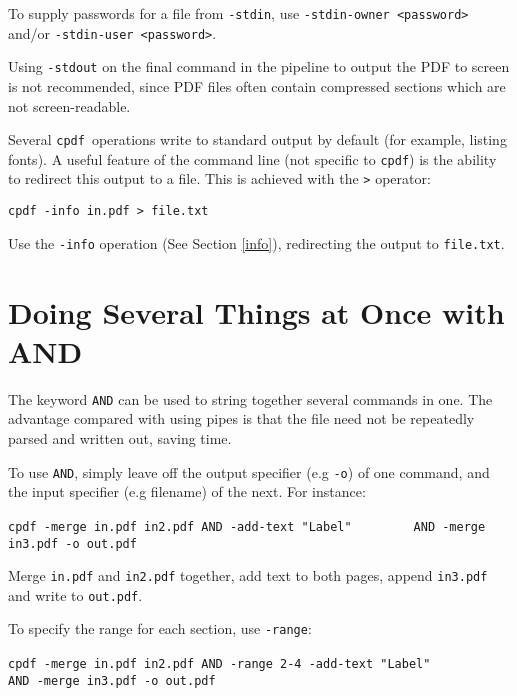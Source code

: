 \documentclass{book}
\newcommand{\cpdf}{\texttt{cpdf}}
\begin{document}
To supply passwords for a file from \texttt{-stdin}, use \texttt{-stdin-owner <password>} and/or \texttt{-stdin-user <password>}.

Using \texttt{-stdout} on the final command in the pipeline to output the PDF
to screen is not recommended, since PDF files often contain compressed sections
which are not screen-readable.

Several \cpdf\ operations write to standard output by default (for
example, listing fonts). A useful feature of the command line (not specific to
\cpdf) is the ability to redirect this output to a file. This is
achieved with the \texttt{>} operator:

\begin{framed}
  \small\verb!cpdf -info in.pdf > file.txt!

  \vspace{2.5mm}
  \noindent Use the \texttt{-info} operation (See Section \ref{info}), redirecting the
output to \texttt{file.txt}.
\end{framed}

\section{Doing Several Things at Once with AND}
The keyword \texttt{AND} can be used to string together several commands in
one. The advantage compared with using pipes is that the file need not be
repeatedly parsed and written out, saving time.

To use \texttt{AND}, simply leave off the output specifier (e.g \texttt{-o}) of
one command, and the input specifier (e.g filename) of the next. For instance:

\begin{framed}
  \small\verb!cpdf -merge in.pdf in2.pdf AND -add-text "Label"!
  \noindent\small\verb!        AND -merge in3.pdf -o out.pdf!

  \vspace{2.5mm}
  \noindent Merge \texttt{in.pdf} and \texttt{in2.pdf} together, add text to both pages, append \texttt{in3.pdf} and write to \texttt{out.pdf}.
\end{framed}

\noindent To specify the range for each section, use \texttt{-range}:

\begin{framed}
  \small\verb!cpdf -merge in.pdf in2.pdf AND -range 2-4 -add-text "Label"!
  \noindent\small\verb!        AND -merge in3.pdf -o out.pdf!

\end{framed}
\end{document}
